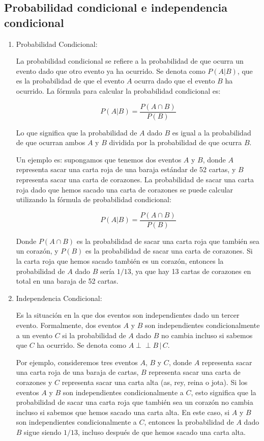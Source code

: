 \subsection*{Probabilidad condicional e independencia condicional}

\begin{enumerate}
    \item Probabilidad Condicional:

La probabilidad condicional se refiere a la probabilidad de que ocurra un evento dado que otro evento ya ha ocurrido. Se denota como \( P(A | B) \), que es la probabilidad de que el evento \( A \) ocurra dado que el evento \( B \) ha ocurrido. La fórmula para calcular la probabilidad condicional es:

\[ P(A | B) = \frac{P(A \cap B)}{P(B)} \]

Lo que significa que la probabilidad de \( A \) dado \( B \) es igual a la probabilidad de que ocurran ambos \( A \) y \( B \) dividida por la probabilidad de que ocurra \( B \).

Un ejemplo es: supongamos que tenemos dos eventos \( A \) y \( B \), donde \( A \) representa sacar una carta roja de una baraja estándar de 52 cartas, y \( B \) representa sacar una carta de corazones. La probabilidad de sacar una carta roja dado que hemos sacado una carta de corazones se puede calcular utilizando la fórmula de probabilidad condicional:

\[ P(A | B) = \frac{P(A \cap B)}{P(B)} \]

Donde \( P(A \cap B) \) es la probabilidad de sacar una carta roja que también sea un corazón, y \( P(B) \) es la probabilidad de sacar una carta de corazones. Si la carta roja que hemos sacado también es un corazón, entonces la probabilidad de \( A \) dado \( B \) sería \( 1/13 \), ya que hay 13 cartas de corazones en total en una baraja de 52 cartas.

\item Independencia Condicional:

Es la situación en la que dos eventos son independientes dado un tercer evento. Formalmente, dos eventos \( A \) y \( B \) son independientes condicionalmente a un evento \( C \) si la probabilidad de \( A \) dado \( B \) no cambia incluso si sabemos que \( C \) ha ocurrido. Se denota como \( A \perp\!\!\!\perp B \,|\, C \).

Por ejemplo, consideremos tres eventos \( A \), \( B \) y \( C \), donde \( A \) representa sacar una carta roja de una baraja de cartas, \( B \) representa sacar una carta de corazones y \( C \) representa sacar una carta alta (as, rey, reina o jota). Si los eventos \( A \) y \( B \) son independientes condicionalmente a \( C \), esto significa que la probabilidad de sacar una carta roja que también sea un corazón no cambia incluso si sabemos que hemos sacado una carta alta. En este caso, si \( A \) y \( B \) son independientes condicionalmente a \( C \), entonces la probabilidad de \( A \) dado \( B \) sigue siendo \( 1/13 \), incluso después de que hemos sacado una carta alta.


\end{enumerate}
